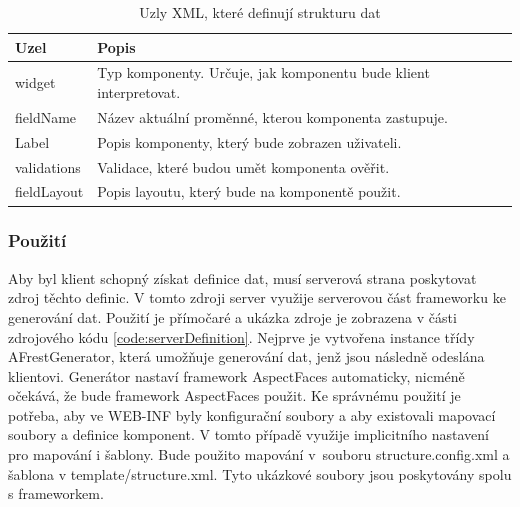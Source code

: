 \begin{table}[width=\linewidth]
\begin{center}
\caption{Uzly XML, které definují strukturu dat}
\label{table:xmlComponentAttributes}
\begin{tabular}{|p{7cm}|p{7cm}|}
\hline
\textbf{Uzel} & \textbf{Popis} \\
\hline
widget & 
Typ komponenty. Určuje, jak komponentu bude klient interpretovat. \\
\hline
fieldName &
Název aktuální proměnné, kterou komponenta zastupuje. \\
\hline
Label &
Popis komponenty, který bude zobrazen uživateli. \\
\hline
validations &
Validace, které budou umět komponenta ověřit. \\
\hline
fieldLayout&
Popis layoutu, který bude na komponentě použit. \\
\hline
\end{tabular}
\end{center}
\end{table}

\subsubsection{Použití}
Aby byl klient schopný získat definice dat, musí serverová strana poskytovat zdroj těchto definic. V tomto zdroji server využije serverovou část frameworku ke generování dat. Použití je přímočaré a ukázka zdroje je zobrazena v části zdrojového kódu \ref{code:serverDefinition}. Nejprve je vytvořena instance třídy AFrestGenerator, která umožňuje generování dat, jenž jsou následně odeslána klientovi. Generátor nastaví framework AspectFaces automaticky, nicméně očekává, že bude framework AspectFaces použit. Ke správnému použití je potřeba, aby ve WEB-INF byly konfigurační soubory a aby existovali mapovací soubory a definice komponent. V tomto případě využije implicitního nastavení pro mapování i šablony. Bude použito mapování v~souboru structure.config.xml a šablona v template/structure.xml. Tyto ukázkové soubory jsou poskytovány spolu s frameworkem.

